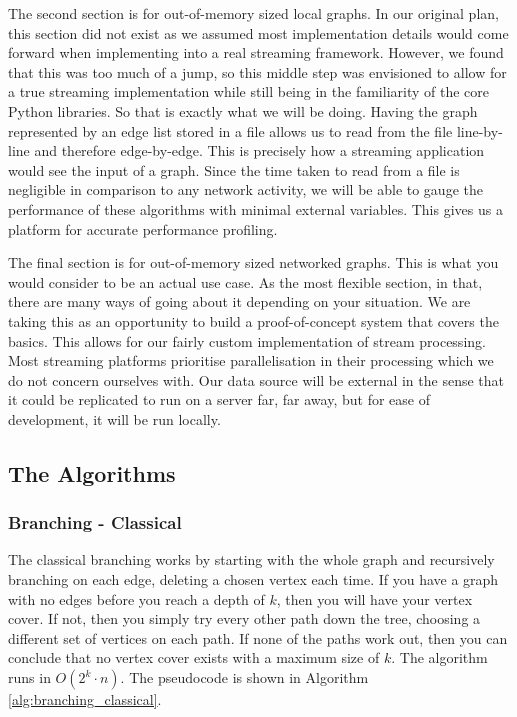 The second section is for out-of-memory sized local graphs. In our original
plan, this section did not exist as we assumed most implementation details
would come forward when implementing into a real streaming framework. However,
we found that this was too much of a jump, so this middle step was envisioned
to allow for a true streaming implementation while still being in the
familiarity of the core Python libraries. So that is exactly what we will be
doing. Having the graph represented by an edge list stored in a file allows us
to read from the file line-by-line and therefore edge-by-edge. This is
precisely how a streaming application would see the input of a graph. Since the
time taken to read from a file is negligible in comparison to any network
activity, we will be able to gauge the performance of these algorithms with
minimal external variables. This gives us a platform for accurate performance
profiling.

The final section is for out-of-memory sized networked graphs. This is what you
would consider to be an actual use case. As the most flexible section, in that,
there are many ways of going about it depending on your situation. We are
taking this as an opportunity to build a proof-of-concept system that covers
the basics. This allows for our fairly custom implementation of stream
processing. Most streaming platforms prioritise parallelisation in their
processing which we do not concern ourselves with. Our data source will be
external in the sense that it could be replicated to run on a server far, far
away, but for ease of development, it will be run locally.

\subsection{The Algorithms}

\subsubsection{Branching - Classical}

The classical branching works by starting with the whole graph and recursively
branching on each edge, deleting a chosen vertex each time. If you have a graph
with no edges before you reach a depth of \(k\), then you will have your vertex
cover. If not, then you simply try every other path down the tree, choosing a
different set of vertices on each path. If none of the paths work out, then you
can conclude that no vertex cover exists with a maximum size of \(k\). The
algorithm runs in \(O(2^k \cdot n)\). The pseudocode is shown in Algorithm
\ref{alg:branching_classical}.


